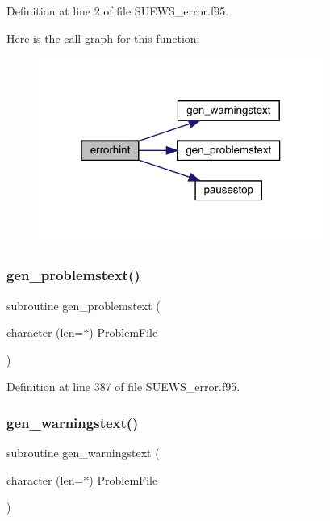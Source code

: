 Definition at line 2 of file S\+U\+E\+W\+S\+\_\+error.\+f95.

Here is the call graph for this function\+:\nopagebreak
\begin{figure}[H]
\begin{center}
\leavevmode
\includegraphics[width=265pt]{_s_u_e_w_s__error_8f95_ac54090fb3ca221d8f45ec0a2a714e6c9_cgraph}
\end{center}
\end{figure}
\mbox{\label{_s_u_e_w_s__error_8f95_a36739091b898d2822d0668fb68791963}} 
\subsubsection{\texorpdfstring{gen\+\_\+problemstext()}{gen\_problemstext()}}
{\footnotesize\ttfamily subroutine gen\+\_\+problemstext (\begin{DoxyParamCaption}\item[{character (len=$\ast$)}]{Problem\+File }\end{DoxyParamCaption})}



Definition at line 387 of file S\+U\+E\+W\+S\+\_\+error.\+f95.

\mbox{\label{_s_u_e_w_s__error_8f95_a94f39ecfb93ed25b35ef27d1467e9a5f}} 
\subsubsection{\texorpdfstring{gen\+\_\+warningstext()}{gen\_warningstext()}}
{\footnotesize\ttfamily subroutine gen\+\_\+warningstext (\begin{DoxyParamCaption}\item[{character (len=$\ast$)}]{Problem\+File }\end{DoxyParamCaption})}



